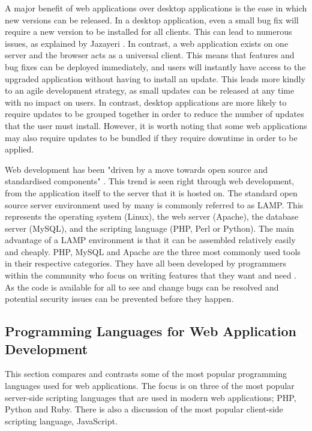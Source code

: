 \documentclass[authoryearcitations]{UoYCSproject}
\begin{document}
A major benefit of web applications over desktop applications is the ease in which new versions can be released. In a desktop application, even a small bug fix will require a new version to be installed for all clients. This can lead to numerous issues, as explained by Jazayeri \citep{Jazayeri2007}. In contrast, a web application exists on one server and the browser acts as a universal client. This means that features and bug fixes can be deployed immediately, and users will instantly have access to the upgraded application without having to install an update. This leads more kindly to an agile development strategy, as small updates can be released at any time with no impact on users. In contrast, desktop applications are more likely to require updates to be grouped together in order to reduce the number of updates that the user must install. However, it is worth noting that some web applications may also require updates to be bundled if they require downtime in order to be applied.  

Web development has been "driven by a move towards open source and standardised components" \citep{Jazayeri2007}. This trend is seen right through web development, from the application itself to the server that it is hosted on. The standard open source server environment used by many is commonly referred to as LAMP. This represents the operating system (Linux), the web server (Apache), the database server (MySQL), and the scripting language (PHP, Perl or Python). The main advantage of a  LAMP environment is that it can be assembled relatively easily and cheaply. PHP, MySQL and Apache are the three most commonly used tools in their respective categories. They have all been developed by programmers within the community who focus on writing features that they want and need \citep{Nixon2009}. As the code is available for all to see and change bugs can be resolved and potential security issues can be prevented before they happen.


\subsection{Programming Languages for Web Application Development}
\label{webproglanguages}

This section compares and contrasts some of the most popular programming languages used for web applications. The focus is on three of the most popular server-side scripting languages that are used in modern web applications; PHP, Python and Ruby. There is also a discussion of the most popular client-side scripting language, JavaScript.
\end{document}

